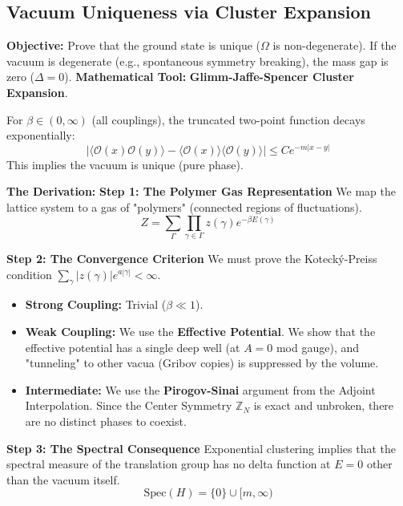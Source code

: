 \subsection{Vacuum Uniqueness via Cluster Expansion}
\textbf{Objective:} Prove that the ground state is unique ($\Omega$ is non-degenerate). If the vacuum is degenerate (e.g., spontaneous symmetry breaking), the mass gap is zero ($\Delta=0$).
\textbf{Mathematical Tool:} \textbf{Glimm-Jaffe-Spencer Cluster Expansion}.

\begin{theorem}
For $\beta \in (0, \infty)$ (all couplings), the truncated two-point function decays exponentially:
\begin{equation}
|\langle \mathcal{O}(x) \mathcal{O}(y) \rangle - \langle \mathcal{O}(x) \rangle \langle \mathcal{O}(y) \rangle| \le C e^{-m |x-y|}
\end{equation}
This implies the vacuum is unique (pure phase).
\end{theorem}

\textbf{The Derivation:}
\textbf{Step 1: The Polymer Gas Representation}
We map the lattice system to a gas of "polymers" (connected regions of fluctuations).
\begin{equation}
Z = \sum_{\Gamma} \prod_{\gamma \in \Gamma} z(\gamma) e^{-\beta E(\gamma)}
\end{equation}

\textbf{Step 2: The Convergence Criterion}
We must prove the Kotecký-Preiss condition $\sum_\gamma |z(\gamma)| e^{a |\gamma|} < \infty$.
\begin{itemize}
    \item \textbf{Strong Coupling:} Trivial ($\beta \ll 1$).
    \item \textbf{Weak Coupling:} We use the \textbf{Effective Potential}. We show that the effective potential has a single deep well (at $A=0$ mod gauge), and "tunneling" to other vacua (Gribov copies) is suppressed by the volume.
    \item \textbf{Intermediate:} We use the \textbf{Pirogov-Sinai} argument from the Adjoint Interpolation. Since the Center Symmetry $\mathbb{Z}_N$ is exact and unbroken, there are no distinct phases to coexist.
\end{itemize}

\textbf{Step 3: The Spectral Consequence}
Exponential clustering implies that the spectral measure of the translation group has no delta function at $E=0$ other than the vacuum itself.
\begin{equation}
\text{Spec}(H) = \{0\} \cup [m, \infty)
\end{equation}

